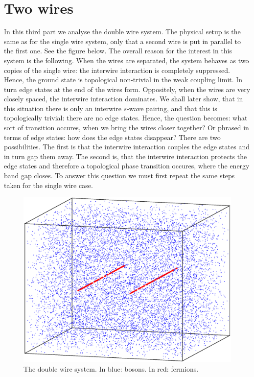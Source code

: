\documentclass[11pt, twoside]{Thesis} %
\begin{document}
{\newpage


 
 
 
 

\part{Two wires}
In this third part we analyse the double wire system. The physical setup is the same as for the single wire system, only that a second wire is put in parallel to the first one. See the figure below. The overall reason for the interest in this system is the following. When the wires are separated, the system behaves as two copies of the single wire: the interwire interaction is completely suppressed. Hence, the ground state is topological non-trivial in the weak coupling limit. In turn edge states at the end of the wires form. Oppositely, when the wires are very closely spaced, the interwire interaction dominates. We shall later show, that in this situation there is only an interwire $s$-wave pairing, and that this is topologically trivial: there are no edge states. Hence, the question becomes: what sort of transition occures, when we bring the wires closer together? Or phrased in terms of edge states: how does the edge states disappear? There are two possibilities. The first is that the interwire interaction couples the edge states and in turn gap them away. The second is, that the interwire interaction protects the edge states and therefore a topological phase transition occures, where the energy band gap closes. To answer this question we must first repeat the same steps taken for the single wire case. 
\begin{figure}[H]
\center
\includegraphics[width=0.8\columnwidth]{gasandwires3.eps}
\\ The double wire system. In blue: bosons. In red: fermions.   
\end{figure}
\newpage

}
\end{document}
